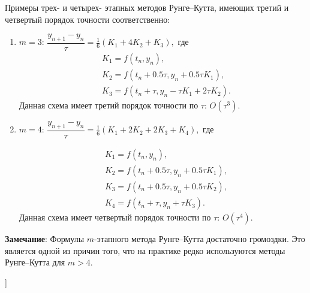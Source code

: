 Примеры трех- и четырех- этапных методов Рунге--Кутта, имеющих третий и четвертый порядок точности соответственно:
%

\begin{enumerate}
%
    \item \textbf{$m=3$}: $\dfrac{y_{n+1} - y_n}{\tau} = \frac16(K_1 + 4K_2 + K_3),$ где
    $$
        \begin{aligned}
            &K_1 = f(t_n, y_n), \\
            &K_2 = f(t_n + 0.5 \tau, y_n + 0.5 \tau K_1), \\
            &K_3 = f(t_n + \tau, y_n - \tau K_1 + 2\tau K_2).
        \end{aligned}
    $$
    Данная схема имеет третий порядок точности по $\tau$: $O(\tau^3)$.

    \item \textbf{$m=4$}: $\dfrac{y_{n+1} - y_n}{\tau} = \frac16 (K_1 + 2K_2 + 2K_3 + K_4),$ где
    
    $$
        \begin{aligned}
            &K_1 = f(t_n, y_n), \\
            &K_2 = f(t_n+0.5\tau, y_n + 0.5\tau K_1), \\
            &K_3 = f(t_n + 0.5 \tau, y_n + 0.5 \tau K_2), \\
            &K_4 = f(t_n + \tau, y_n + \tau K_3).
        \end{aligned}
    $$
    Данная схема имеет четвертый порядок точности по $\tau$: $O(\tau^4)$.

\end{enumerate}

%
\textbf{Замечание}: Формулы $m$-этапного метода Рунге--Кутта достаточно громоздки. Это является одной из причин того, что на практике редко используются методы Рунге--Кутта для $m > 4$.
%




\bigbreak
[\cite[page 152-163]{chimi}]